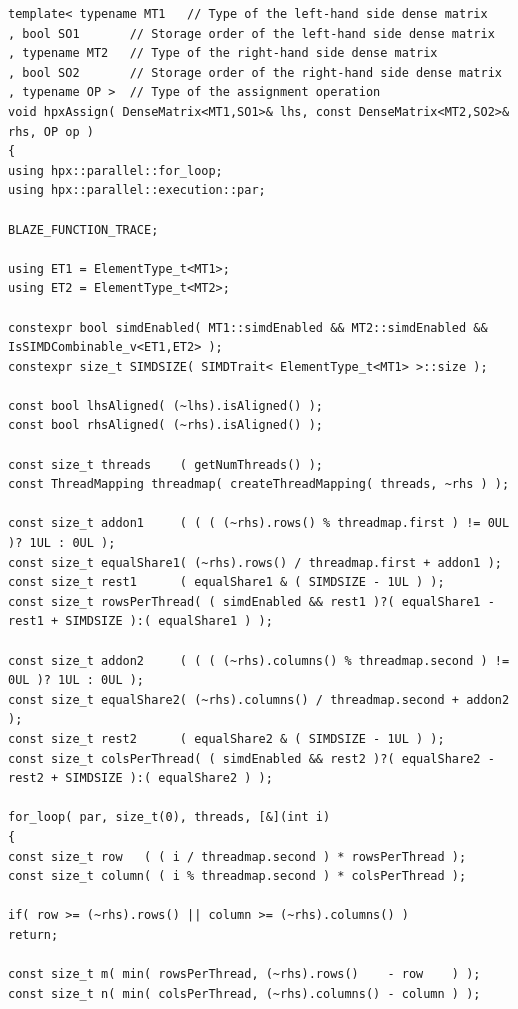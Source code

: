 \begin{lstlisting}[basicstyle=\fontsize{8}{9}\selectfont,float,floatplacement=H,caption= {Previous implementation of Assign function for HPX backend in Blaze.}, label={old_hpx_backend}]
template< typename MT1   // Type of the left-hand side dense matrix
, bool SO1       // Storage order of the left-hand side dense matrix
, typename MT2   // Type of the right-hand side dense matrix
, bool SO2       // Storage order of the right-hand side dense matrix
, typename OP >  // Type of the assignment operation
void hpxAssign( DenseMatrix<MT1,SO1>& lhs, const DenseMatrix<MT2,SO2>& rhs, OP op )
{
using hpx::parallel::for_loop;
using hpx::parallel::execution::par;

BLAZE_FUNCTION_TRACE;

using ET1 = ElementType_t<MT1>;
using ET2 = ElementType_t<MT2>;

constexpr bool simdEnabled( MT1::simdEnabled && MT2::simdEnabled && IsSIMDCombinable_v<ET1,ET2> );
constexpr size_t SIMDSIZE( SIMDTrait< ElementType_t<MT1> >::size );

const bool lhsAligned( (~lhs).isAligned() );
const bool rhsAligned( (~rhs).isAligned() );

const size_t threads    ( getNumThreads() );
const ThreadMapping threadmap( createThreadMapping( threads, ~rhs ) );

const size_t addon1     ( ( ( (~rhs).rows() % threadmap.first ) != 0UL )? 1UL : 0UL );
const size_t equalShare1( (~rhs).rows() / threadmap.first + addon1 );
const size_t rest1      ( equalShare1 & ( SIMDSIZE - 1UL ) );
const size_t rowsPerThread( ( simdEnabled && rest1 )?( equalShare1 - rest1 + SIMDSIZE ):( equalShare1 ) );

const size_t addon2     ( ( ( (~rhs).columns() % threadmap.second ) != 0UL )? 1UL : 0UL );
const size_t equalShare2( (~rhs).columns() / threadmap.second + addon2 );
const size_t rest2      ( equalShare2 & ( SIMDSIZE - 1UL ) );
const size_t colsPerThread( ( simdEnabled && rest2 )?( equalShare2 - rest2 + SIMDSIZE ):( equalShare2 ) );

for_loop( par, size_t(0), threads, [&](int i)
{
const size_t row   ( ( i / threadmap.second ) * rowsPerThread );
const size_t column( ( i % threadmap.second ) * colsPerThread );

if( row >= (~rhs).rows() || column >= (~rhs).columns() )
return;

const size_t m( min( rowsPerThread, (~rhs).rows()    - row    ) );
const size_t n( min( colsPerThread, (~rhs).columns() - column ) );


\end{lstlisting}

